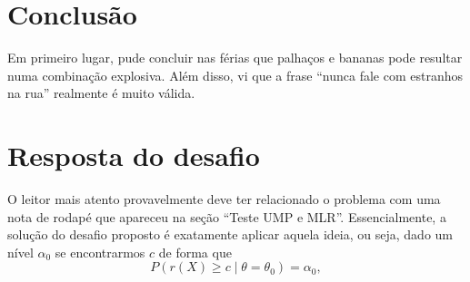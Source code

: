 \documentclass{article}
\begin{document}
\section*{Conclusão}

Em primeiro lugar, pude concluir nas férias que palhaços e bananas pode resultar numa combinação explosiva. Além disso, vi que a frase ``nunca fale com estranhos na rua'' realmente é muito válida.

\begin{comment}
Já no início pudemos ter uma boa ideia do significado da precisão, sendo visualizada como uma métrica de proximidade dos dados em relação a média. Após isso passamos a fazer uma análise bayesiana com a normal com média e precisão desconhecidas. Feita a análise, descobrimos mais uma família conjugada, agora com duas distribuições a priori. Além disso, a visualização de $\lambda_0$ como um nível de certeza a priori acabou deixando o cálculo da média a posteriori, $\mu_1$, um pouco mais intuitivo. Além dele, vimos que $\alpha_0$ e $\beta_0$ são hiperparâmetros que irão contribuir na forma da posteriori de $\mu$, ditando a concentração em torno de $\mu_1$.

Chegando no exemplo vimos que a escolha da priori tem certa relevância no cálculo da posteriori, embora os intervalos de credibilidade que foram gerados ficaram próximos. Além disso, vimos que a medida em que $n$ cresce essa relevância  da priori diminui. Ou seja, a priori pode ser gerada de diversas formas, a depender da interpretação de quem vai elaborá-la, mas a posteriori nos dará resultados similares e, com uma grande amostragem, as posterioris tendem a uma mesma distribuição.

Assim, uma das maiores lições desse trabalho é que elicitar prioris pode ser muito complicado, podendo ser considerada uma arte na qual o ponto de vista e interpretação do artista pode ser crucial para obtermos um resultado razoável ou então um totalmente descartável.

Por fim, talvez seria interessante alguém falar com Palmirinha para ela buscar um assistente menos comilão, imagine ele fazendo uma amostragem de $100$ pamonhas!

\end{comment}

\section*{Resposta do desafio}

O leitor mais atento provavelmente deve ter relacionado o problema com uma nota de rodapé que apareceu na seção ``Teste UMP e MLR''. Essencialmente, a solução do desafio proposto é exatamente aplicar aquela ideia, ou seja, dado um nível $\alpha_0$ se encontrarmos $c$ de forma que
\[P(r(X) \geq c \mid \theta = \theta_0) = \alpha_0,\]
\end{document}
